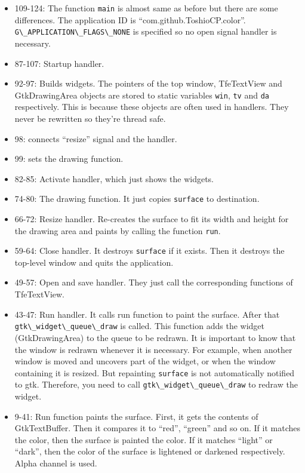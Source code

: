 \begin{itemize}
\tightlist
\item
  109-124: The function \passthrough{\lstinline!main!} is almost same as
  before but there are some differences. The application ID is
  ``com.github.ToshioCP.color''.
  \passthrough{\lstinline!G\_APPLICATION\_FLAGS\_NONE!} is specified so
  no open signal handler is necessary.
\item
  87-107: Startup handler.
\item
  92-97: Builds widgets. The pointers of the top window, TfeTextView and
  GtkDrawingArea objects are stored to static variables
  \passthrough{\lstinline!win!}, \passthrough{\lstinline!tv!} and
  \passthrough{\lstinline!da!} respectively. This is because these
  objects are often used in handlers. They never be rewritten so they're
  thread safe.
\item
  98: connects ``resize'' signal and the handler.
\item
  99: sets the drawing function.
\item
  82-85: Activate handler, which just shows the widgets.
\item
  74-80: The drawing function. It just copies
  \passthrough{\lstinline!surface!} to destination.
\item
  66-72: Resize handler. Re-creates the surface to fit its width and
  height for the drawing area and paints by calling the function
  \passthrough{\lstinline!run!}.
\item
  59-64: Close handler. It destroys \passthrough{\lstinline!surface!} if
  it exists. Then it destroys the top-level window and quits the
  application.
\item
  49-57: Open and save handler. They just call the corresponding
  functions of TfeTextView.
\item
  43-47: Run handler. It calls run function to paint the surface. After
  that \passthrough{\lstinline!gtk\_widget\_queue\_draw!} is called.
  This function adds the widget (GtkDrawingArea) to the queue to be
  redrawn. It is important to know that the window is redrawn whenever
  it is necessary. For example, when another window is moved and
  uncovers part of the widget, or when the window containing it is
  resized. But repainting \passthrough{\lstinline!surface!} is not
  automatically notified to gtk. Therefore, you need to call
  \passthrough{\lstinline!gtk\_widget\_queue\_draw!} to redraw the
  widget.
\item
  9-41: Run function paints the surface. First, it gets the contents of
  GtkTextBuffer. Then it compares it to ``red'', ``green'' and so on. If
  it matches the color, then the surface is painted the color. If it
  matches ``light'' or ``dark'', then the color of the surface is
  lightened or darkened respectively. Alpha channel is used.
\end{itemize}

